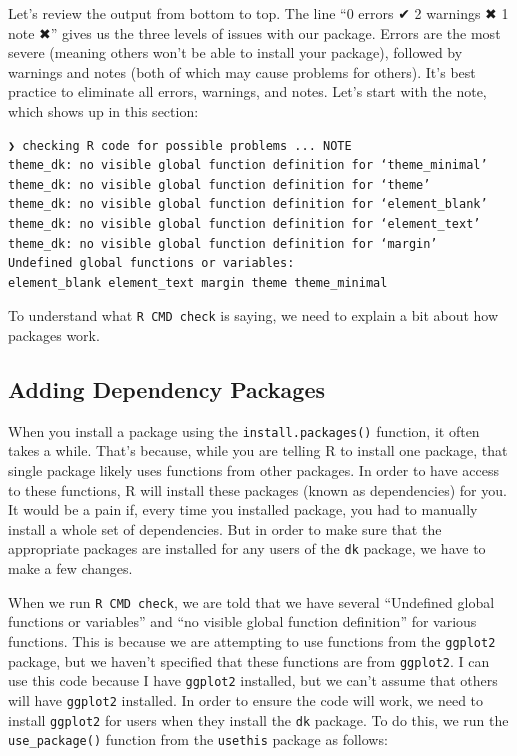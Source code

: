 \documentclass[
]{book}
\begin{document}
Let's review the output from bottom to top. The line ``0 errors ✔ \textbar{} 2 warnings ✖ \textbar{} 1 note ✖'' gives us the three levels of issues with our package. Errors are the most severe (meaning others won't be able to install your package), followed by warnings and notes (both of which may cause problems for others). It's best practice to eliminate all errors, warnings, and notes. Let's start with the note, which shows up in this section:

\begin{verbatim}
❯ checking R code for possible problems ... NOTE
theme_dk: no visible global function definition for ‘theme_minimal’
theme_dk: no visible global function definition for ‘theme’
theme_dk: no visible global function definition for ‘element_blank’
theme_dk: no visible global function definition for ‘element_text’
theme_dk: no visible global function definition for ‘margin’
Undefined global functions or variables:
element_blank element_text margin theme theme_minimal
\end{verbatim}

To understand what \texttt{R\ CMD\ check} is saying, we need to explain a bit about how packages work.

\hypertarget{adding-dependency-packages}{%
\subsection*{Adding Dependency Packages}\label{adding-dependency-packages}}

When you install a package using the \texttt{install.packages()} function, it often takes a while. That's because, while you are telling R to install one package, that single package likely uses functions from other packages. In order to have access to these functions, R will install these packages (known as dependencies) for you. It would be a pain if, every time you installed package, you had to manually install a whole set of dependencies. But in order to make sure that the appropriate packages are installed for any users of the \texttt{dk} package, we have to make a few changes.

When we run \texttt{R\ CMD\ check}, we are told that we have several ``Undefined global functions or variables'' and ``no visible global function definition'' for various functions. This is because we are attempting to use functions from the \texttt{ggplot2} package, but we haven't specified that these functions are from \texttt{ggplot2}. I can use this code because I have \texttt{ggplot2} installed, but we can't assume that others will have \texttt{ggplot2} installed. In order to ensure the code will work, we need to install \texttt{ggplot2} for users when they install the \texttt{dk} package. To do this, we run the \texttt{use\_package()} function from the \texttt{usethis} package as follows:
\end{document}
